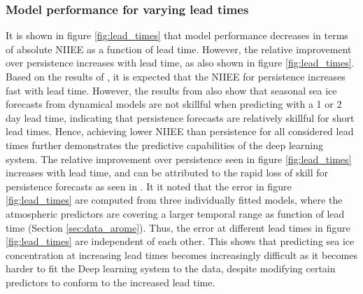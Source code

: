 \documentclass[../main/thesis]{subfiles}
\begin{document}
\subsubsection{Model performance for varying lead times}
\label{sec:discuss_perf_leadtimes}
It is shown in figure \ref{fig:lead_times} that model performance decreases in terms of absolute NIIEE as a function of lead time. However, the relative improvement over persistence increases with lead time, as also shown in figure \ref{fig:lead_times}. Based on the results of \citet{Zampieri2019}, it is expected that the NIIEE for persistence increases fast with lead time. However, the results from \citet{Zampieri2019} also show that seasonal sea ice forecasts from dynamical models are not skillful when predicting with a 1 or 2 day lead time, indicating that persistence forecasts are relatively skillful for short lead times. Hence, achieving lower NIIEE than persistence for all considered lead times further demonstrates the predictive capabilities of the deep learning system. The relative improvement over persistence seen in figure \ref{fig:lead_times} increases with lead time, and can be attributed to the rapid loss of skill for persistence forecasts as seen in \citet{Zampieri2019}. It it noted that the error in figure \ref{fig:lead_times} are computed from three individually fitted models, where the atmospheric predictors are covering a larger temporal range as function of lead time (Section \ref{sec:data_arome}). Thus, the error at different lead times in figure \ref{fig:lead_times} are independent of each other. This shows that predicting sea ice concentration at increasing lead times becomes increasingly difficult as it becomes harder to fit the Deep learning system to the data, despite modifying certain predictors to conform to the increased lead time.
\end{document}
